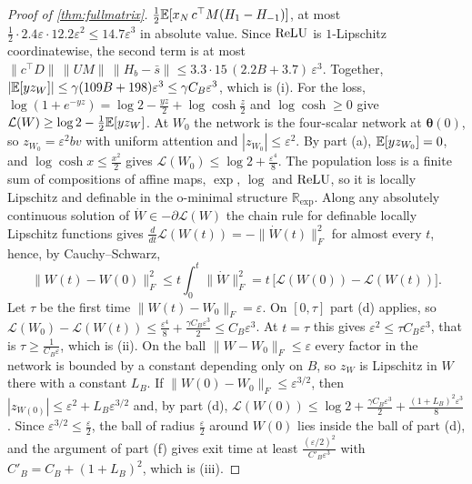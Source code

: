 \begin{proof}[Proof of \cref{thm:fullmatrix}]
$\tfrac12\mathbb E[x_N\,c^\top M(H_1-H_{-1})]$, at most $\tfrac12\cdot2.4\varepsilon\cdot12.2\varepsilon^2\le14.7\varepsilon^3$ in absolute value.
Since $\operatorname{ReLU}$ is $1$-Lipschitz coordinatewise, the second term is at most $\|c^\top D\|\,\|UM\|\,\|H_b-\bar s\|\le3.3\cdot15\,(2.2B+3.7)\,\varepsilon^3$.
Together, $|\mathbb E[yz_W]|\le\gamma(109B+198)\varepsilon^3\le\gamma C_B\varepsilon^3$, which is (i).
For the loss, $\log(1+e^{-yz})=\log2-\tfrac{yz}{2}+\log\cosh\tfrac{z}{2}$ and $\log\cosh\ge0$ give $\mathcal L(W)\ge\log2-\tfrac12\mathbb E[yz_W]$.
At $W_0$ the network is the four-scalar network at $\bm\theta(0)$, so $z_{W_0}=\varepsilon^2bv$ with uniform attention and $|z_{W_0}|\le\varepsilon^2$.
By part (a), $\mathbb E[yz_{W_0}]=0$, and $\log\cosh x\le\tfrac{x^2}{2}$ gives $\mathcal L(W_0)\le\log2+\tfrac{\varepsilon^4}{8}$.
The population loss is a finite sum of compositions of affine maps, $\exp$, $\log$ and $\operatorname{ReLU}$, so it is locally Lipschitz and definable in the o-minimal structure $\mathbb R_{\exp}$.
Along any absolutely continuous solution of $\dot W\in-\partial\mathcal L(W)$ the chain rule for definable locally Lipschitz functions \citep{davis2020stochastic} gives
$\tfrac{d}{dt}\mathcal L(W(t))=-\|\dot W(t)\|_F^2$ for almost every $t$, hence, by Cauchy--Schwarz,
\[
 \|W(t)-W(0)\|_F^2\le t\int_0^t\|\dot W\|_F^2=t\,\bigl[\mathcal L(W(0))-\mathcal L(W(t))\bigr].
\]
Let $\tau$ be the first time $\|W(t)-W_0\|_F=\varepsilon$. On $[0,\tau]$ part (d) applies, so $\mathcal L(W_0)-\mathcal L(W(t))\le\tfrac{\varepsilon^4}{8}+\tfrac{\gamma C_B\varepsilon^3}{2}\le C_B\varepsilon^3$.
At $t=\tau$ this gives $\varepsilon^2\le\tau C_B\varepsilon^3$, that is $\tau\ge\tfrac{1}{C_B\varepsilon}$, which is (ii).
On the ball $\|W-W_0\|_F\le\varepsilon$ every factor in the network is bounded by a constant depending only on $B$, so $z_W$ is Lipschitz in $W$ there with a constant $L_B$.
If $\|W(0)-W_0\|_F\le\varepsilon^{3/2}$, then $|z_{W(0)}|\le\varepsilon^2+L_B\varepsilon^{3/2}$ and, by part (d),
$\mathcal L(W(0))\le\log2+\tfrac{\gamma C_B\varepsilon^3}{2}+\tfrac{(1+L_B)^2\varepsilon^3}{8}$.
Since $\varepsilon^{3/2}\le\tfrac{\varepsilon}{2}$, the ball of radius $\tfrac{\varepsilon}{2}$ around $W(0)$ lies inside the ball of part (d), and the argument of part (f) gives exit time at least
$\tfrac{(\varepsilon/2)^2}{C'_B\varepsilon^3}$ with $C'_B=C_B+(1+L_B)^2$, which is (iii).\qedhere
\end{proof}
